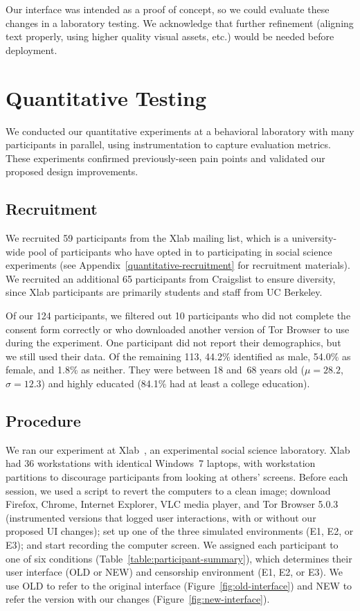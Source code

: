\documentclass[USenglish,oneside,twocolumn]{article}
\begin{document}
Our interface was intended as a proof of concept, so we could evaluate these changes in a laboratory testing. We acknowledge that further refinement (aligning text properly, using higher quality visual assets, etc.) would be needed before deployment. 

\section{Quantitative Testing}
\label{sec:quantitative}
We conducted our quantitative experiments at a behavioral laboratory with many participants in parallel, using instrumentation to capture evaluation metrics. These experiments confirmed previously-seen pain points and validated our proposed design improvements.

\subsection{Recruitment}
We recruited 59 participants from the Xlab mailing list, which is a university-wide pool of participants who have opted in to participating in social science experiments (see Appendix~\ref{quantitative-recruitment} for recruitment materials). We recruited an additional 65 participants from Craigslist to ensure diversity, since Xlab participants are primarily students and staff from UC Berkeley.

Of our 124 participants, we filtered out 10 participants who did not complete the consent form correctly or who downloaded another version of Tor Browser to use during the experiment. One participant did not report their demographics, but we still used their data. Of the remaining 113, 44.2\% identified as male, 54.0\% as female, and 1.8\% as neither. They were between 18 and~68 years old ($\mu = 28.2$, $\sigma = 12.3$) and highly educated (84.1\% had at least a college education). 

\subsection{Procedure}
We ran our experiment at Xlab~\cite{xlab}, an experimental social science laboratory. Xlab had 36 workstations with identical Windows~7 laptops, with workstation partitions to discourage participants from looking at others' screens.  Before each session, we used a script to revert the computers to a clean image; download Firefox, Chrome, Internet Explorer, VLC media player, and Tor Browser 5.0.3 (instrumented versions that logged user interactions, with or without our proposed UI changes); set up one of the three simulated environments (E1, E2, or E3); and start recording the computer screen.
We assigned each participant to one of six conditions (Table~\ref{table:participant-summary}), which determines their user interface (OLD or NEW) and censorship environment (E1, E2, or E3).
We use OLD to refer to the original interface (Figure~\ref{fig:old-interface}) and NEW to refer the version with our changes (Figure~\ref{fig:new-interface}).
\end{document}
